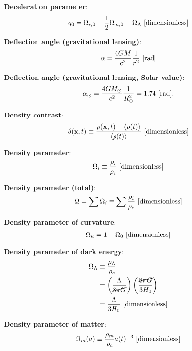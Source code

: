 \documentclass[a4paper,10pt]{article}
\begin{document}
{\noindent}\textbf{Deceleration parameter}:
\begin{align*}
    q_0 = \Omega_{r,0} + \frac{1}{2}\Omega_{m,0} - \Omega_\Lambda ~ [{\rm dimensionless}]
\end{align*}

{\noindent}\textbf{Deflection angle (gravitational lensing)}:
\begin{align*}
    \alpha = \frac{4GM}{c^2}\frac{1}{r^2} ~ [{\rm rad}]
\end{align*}

{\noindent}\textbf{Deflection angle (gravitational lensing, Solar value)}:
\begin{align*}
    \alpha_\odot = \frac{4GM_\odot}{c^2}\frac{1}{R_\odot^2} = 1.74 ~ [{\rm rad}].
\end{align*}

{\noindent}\textbf{Density contrast}:
\begin{align*}
    \delta(\mathbf{x},t) \equiv \frac{\rho(\mathbf{x},t)-\langle\rho(t)\rangle}{\langle\rho(t)\rangle} ~ [{\rm dimensionless}]
\end{align*}

{\noindent}\textbf{Density parameter}:
\begin{align*}
    \Omega_i \equiv \frac{\rho_i}{\rho_c} ~ [{\rm dimensionless}]
\end{align*}

{\noindent}\textbf{Density parameter (total)}:
\begin{align*}
    \Omega = \sum\Omega_i \equiv \sum \frac{\rho_i}{\rho_c} ~ [{\rm dimensionless}]
\end{align*}

{\noindent}\textbf{Density parameter of curvature}:
\begin{align*}
    \Omega_\kappa = 1-\Omega_0 ~ [{\rm dimensionless}]
\end{align*}

{\noindent}\textbf{Density parameter of dark energy}:
\begin{align*}
    \Omega_\Lambda &\equiv \dfrac{\rho_\Lambda}{\rho_c} \\
    &= \left(\dfrac{\Lambda}{\cancel{8\pi G}}\right) \left(\dfrac{\cancel{8\pi G}}{3H_0}\right) \\
    &= \dfrac{\Lambda}{3H_0} ~ [{\rm dimensionless}]
\end{align*}

{\noindent}\textbf{Density parameter of matter}:
\begin{align*}
    \Omega_m(a) \equiv \dfrac{\rho_m}{\rho_c}a(t)^{-3} ~ [{\rm dimensionless}]
\end{align*}
\end{document}
